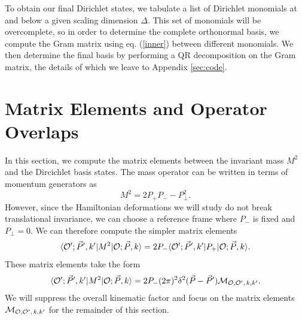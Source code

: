 \begin{subappendices}
To obtain our final Dirichlet states, we tabulate a list of Dirichlet monomials at and below a given scaling dimension $\Delta$. This set of monomials will be overcomplete, so in order to determine the complete orthonormal basis, we compute the Gram matrix using eq. (\ref{inner}) between different monomials. We then determine the final basis by performing a QR decomposition on the Gram matrix, the details of which we leave to Appendix \ref{sec:code}.



\section{Matrix Elements and Operator Overlaps}
\label{sec:MatrixElements}

In this section, we compute the matrix elements between the invariant mass $M^2$ and the Dircichlet basis states. The mass operator can be written in terms of momentum generators as \begin{equation}
	M^2 = 2P_+ P_- - P_\bot^2.
\end{equation} However, since the Hamiltonian deformations we will study do not break translational invariance, we can choose a reference frame where $P_-$ is fixed and $P_\bot = 0$. We can therefore compute the simpler matrix elements \begin{equation}
	\langle {\cal O}'; \vec{P}', k'| M^2 |{\cal O}; \vec{P}, k\rangle = 2P_- \langle {\cal O}'; \vec{P}', k'| P_+ |{\cal O}; \vec{P}, k\rangle.
\end{equation} These matrix elements take the form \begin{equation}
	\begin{aligned}
		\langle {\cal O}'; \vec{P}', k'| M^2 |{\cal O}; \vec{P}, k\rangle = 2P_- (2\pi)^2 \delta^2(\vec{P}- \vec{P}') {{\cal M}}_{{\cal O},{\cal O}', \, k, k'}.
	\end{aligned}
\end{equation} We will suppress the overall kinematic factor and focus on the matrix elements $ {\cal M}_{{\cal O},{\cal O}', \, k, k'}$ for the remainder of this section.



\end{subappendices}
